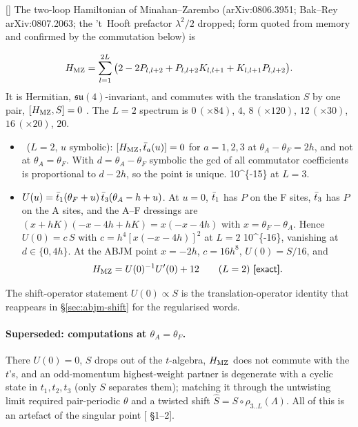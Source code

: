 {\raggedright [] The two-loop Hamiltonian of Minahan--Zarembo (arXiv:0806.3951; Bak--Rey arXiv:0807.2063; the 't~Hooft
prefactor $\lambda^2/2$ dropped; form quoted from memory and confirmed by the commutation below) is\par}
\begin{equation}
 H_{\rm MZ}=\sum_{l=1}^{2L}\big(2-2P_{l,l+2}+P_{l,l+2}K_{l,l+1}+K_{l,l+1}P_{l,l+2}\big).
\end{equation}
It is Hermitian, $\mathfrak{su}(4)$-invariant, and commutes with the translation $S$ by one pair, $[H_{\rm MZ},S]=0$ \ex. The
$L=2$ spectrum is $0\,(\times84)$, $4$, $8\,(\times120)$, $12\,(\times30)$, $16\,(\times20)$, $20$.
\begin{itemize}
\item \ex\ ($L=2$, $u$ symbolic): $[H_{\rm MZ},\bar t_a(u)]=0$ for $a=1,2,3$ at $\theta_A-\theta_F=2h$, and not at
 $\theta_A=\theta_F$. With $d=\theta_A-\theta_F$ symbolic the gcd of all commutator coefficients is proportional to $d-2h$, so
 the point is unique. \num{10^{-15}} at $L=3$.
\item $U(u)=\bar t_1(\theta_F+u)\,\bar t_3(\theta_A-h+u)$. At $u=0$, $\bar t_1$ has $P$ on the F sites, $\bar t_3$ has $P$ on the A sites,
 and the A--F dressings are $(x+hK)(-x-4h+hK)=x(-x-4h)$ with $x=\theta_F-\theta_A$. Hence $U(0)=c\,S$ with
 $c=h^4[x(-x-4h)]^2$ at $L=2$ \num{10^{-16}}, vanishing at $d\in\{0,4h\}$. At the ABJM point $x=-2h$, $c=16h^8$,
 $U(0)=S/16$, and
 \begin{equation}
 H_{\rm MZ}=U(0)^{-1}U'(0)+12\qquad(L=2)\ \textsf{[exact]} .
 \end{equation}
\end{itemize}
The shift-operator statement $U(0)\propto S$ is the translation-operator identity that reappears in
\S\ref{sec:abjm-shift} for the regularised words.

\paragraph{Superseded: computations at $\theta_A=\theta_F$.} There $U(0)=0$, $S$ drops out of the $t$-algebra, $H_{\rm MZ}$ does not
commute with the $t$'s, and an odd-momentum highest-weight partner is degenerate with a cyclic state in $t_1,t_2,t_3$
(only $S$ separates them); matching it through the untwisting limit required pair-periodic $\theta$ and a twisted shift
$\hat S=S\circ\rho_{3..L}(\Lambda)$. All of this is an artefact of the singular point [ \S1--2].

